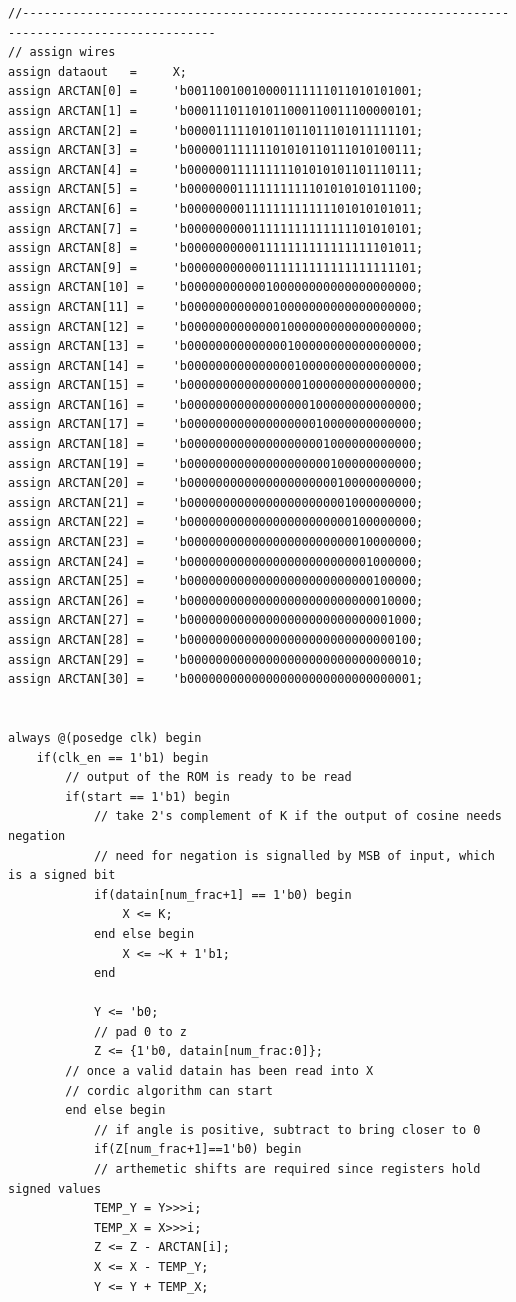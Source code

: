 \documentclass{article}
\begin{document}
\begin{verbatim}
//-------------------------------------------------------------------------------------------------
// assign wires
assign dataout   =     X;
assign ARCTAN[0] =     'b00110010010000111111011010101001;
assign ARCTAN[1] =     'b00011101101011000110011100000101;
assign ARCTAN[2] =     'b00001111101011011011101011111101;
assign ARCTAN[3] =     'b00000111111101010110111010100111;
assign ARCTAN[4] =     'b00000011111111101010101101110111;
assign ARCTAN[5] =     'b00000001111111111101010101011100;
assign ARCTAN[6] =     'b00000000111111111111101010101011;
assign ARCTAN[7] =     'b00000000011111111111111101010101;
assign ARCTAN[8] =     'b00000000001111111111111111101011;
assign ARCTAN[9] =     'b00000000000111111111111111111101;
assign ARCTAN[10] =    'b00000000000100000000000000000000;
assign ARCTAN[11] =    'b00000000000010000000000000000000;
assign ARCTAN[12] =    'b00000000000001000000000000000000;
assign ARCTAN[13] =    'b00000000000000100000000000000000;
assign ARCTAN[14] =    'b00000000000000010000000000000000;
assign ARCTAN[15] =    'b00000000000000001000000000000000;
assign ARCTAN[16] =    'b00000000000000000100000000000000;
assign ARCTAN[17] =    'b00000000000000000010000000000000;
assign ARCTAN[18] =    'b00000000000000000001000000000000;
assign ARCTAN[19] =    'b00000000000000000000100000000000;
assign ARCTAN[20] =    'b00000000000000000000010000000000;
assign ARCTAN[21] =    'b00000000000000000000001000000000;
assign ARCTAN[22] =    'b00000000000000000000000100000000;
assign ARCTAN[23] =    'b00000000000000000000000010000000;
assign ARCTAN[24] =    'b00000000000000000000000001000000;
assign ARCTAN[25] =    'b00000000000000000000000000100000;
assign ARCTAN[26] =    'b00000000000000000000000000010000;
assign ARCTAN[27] =    'b00000000000000000000000000001000;
assign ARCTAN[28] =    'b00000000000000000000000000000100;
assign ARCTAN[29] =    'b00000000000000000000000000000010;
assign ARCTAN[30] =    'b00000000000000000000000000000001;


always @(posedge clk) begin
    if(clk_en == 1'b1) begin
        // output of the ROM is ready to be read
        if(start == 1'b1) begin
            // take 2's complement of K if the output of cosine needs negation
            // need for negation is signalled by MSB of input, which is a signed bit
            if(datain[num_frac+1] == 1'b0) begin
                X <= K;
            end else begin
                X <= ~K + 1'b1;
            end
            
            Y <= 'b0;
            // pad 0 to z
            Z <= {1'b0, datain[num_frac:0]};
        // once a valid datain has been read into X
        // cordic algorithm can start
        end else begin
            // if angle is positive, subtract to bring closer to 0
            if(Z[num_frac+1]==1'b0) begin
            // arthemetic shifts are required since registers hold signed values
            TEMP_Y = Y>>>i;
            TEMP_X = X>>>i;
            Z <= Z - ARCTAN[i];
            X <= X - TEMP_Y;
            Y <= Y + TEMP_X;


\end{verbatim}
\end{document}
